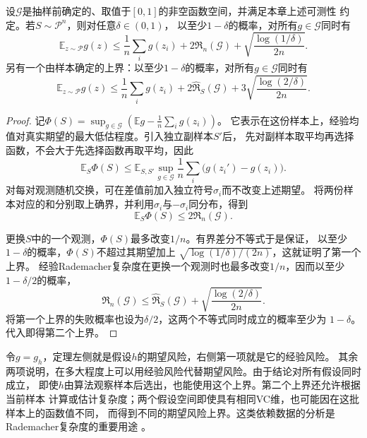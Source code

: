 \begin{theorem}[Rademacher复杂度给出的期望风险上界]
\label{thm:rademacher-risk-bound}
设$\mathcal G$是抽样前确定的、取值于$[0,1]$的非空函数空间，并满足本章上述可测性
约定。若$S\sim\mathcal P^n$，则对任意$\delta\in(0,1)$，
以至少$1-\delta$的概率，对所有$g\in\mathcal G$同时有
\begin{equation}
 \mathbb E_{z\sim\mathcal P}g(z)
 \leq\frac1n\sum_i g(z_i)+2\mathfrak R_n(\mathcal G)
 +\sqrt{\frac{\log(1/\delta)}{2n}}.
 \label{eq:rademacher-risk-bound}
\end{equation}
另有一个由样本确定的上界：以至少$1-\delta$的概率，对所有$g\in\mathcal G$同时有
\begin{equation}
 \mathbb E_{z\sim\mathcal P}g(z)
 \leq\frac1n\sum_i g(z_i)+2\widehat{\mathfrak R}_S(\mathcal G)
 +3\sqrt{\frac{\log(2/\delta)}{2n}}.
 \label{eq:empirical-rademacher-risk-bound}
\end{equation}
\end{theorem}

\begin{proof}
记$\Phi(S)=\sup_{g\in\mathcal G}(\mathbb E g-\frac1n\sum_i g(z_i))$。
它表示在这份样本上，经验均值对真实期望的最大低估程度。引入独立副样本$S'$后，
先对副样本取平均再选择函数，不会大于先选择函数再取平均，因此
\[
 \mathbb E_S\Phi(S)
 \leq\mathbb E_{S,S'}\sup_{g\in\mathcal G}
 \frac1n\sum_i\bigl(g(z_i')-g(z_i)\bigr).
\]
对每对观测随机交换，可在差值前加入独立符号$\sigma_i$而不改变上述期望。
将两份样本对应的和分别取上确界，并利用$\sigma_i$与$-\sigma_i$同分布，得到
\begin{equation}
 \mathbb E_S\Phi(S)\leq2\mathfrak R_n(\mathcal G).
 \label{eq:rademacher-symmetrization}
\end{equation}

更换$S$中的一个观测，$\Phi(S)$最多改变$1/n$。有界差分不等式于是保证，
以至少$1-\delta$的概率，$\Phi(S)$不超过其期望加上
$\sqrt{\log(1/\delta)/(2n)}$，这就证明了第一个上界。
经验Rademacher复杂度在更换一个观测时也最多改变$1/n$，因而以至少$1-\delta/2$的概率，
\[
 \mathfrak R_n(\mathcal G)
 \leq\widehat{\mathfrak R}_S(\mathcal G)
 +\sqrt{\frac{\log(2/\delta)}{2n}}.
\]
将第一个上界的失败概率也设为$\delta/2$，这两个不等式同时成立的概率至少为
$1-\delta$。代入即得第二个上界。
\end{proof}

令$g=g_h$，定理左侧就是假设$h$的期望风险，右侧第一项就是它的经验风险。
其余两项说明，在多大程度上可以用经验风险代替期望风险。由于结论对所有假设同时成立，
即使$h$由算法观察样本后选出，也能使用这个上界。第二个上界还允许根据当前样本
计算或估计复杂度；两个假设空间即使具有相同VC维，也可能因在这批样本上的函数值不同，
而得到不同的期望风险上界。这类依赖数据的分析是Rademacher复杂度的重要用途
。


